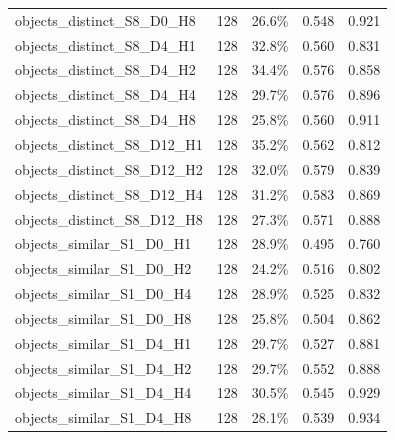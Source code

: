 \documentclass[11pt]{article}
\begin{document}
\begin{longtable}{p{}rrrr}
objects\_\allowbreak{}distinct\_\allowbreak{}S8\_\allowbreak{}D0\_\allowbreak{}H8 & 128 & 26.6\% & 0.548 & 0.921\\
objects\_\allowbreak{}distinct\_\allowbreak{}S8\_\allowbreak{}D4\_\allowbreak{}H1 & 128 & 32.8\% & 0.560 & 0.831\\
objects\_\allowbreak{}distinct\_\allowbreak{}S8\_\allowbreak{}D4\_\allowbreak{}H2 & 128 & 34.4\% & 0.576 & 0.858\\
objects\_\allowbreak{}distinct\_\allowbreak{}S8\_\allowbreak{}D4\_\allowbreak{}H4 & 128 & 29.7\% & 0.576 & 0.896\\
objects\_\allowbreak{}distinct\_\allowbreak{}S8\_\allowbreak{}D4\_\allowbreak{}H8 & 128 & 25.8\% & 0.560 & 0.911\\
objects\_\allowbreak{}distinct\_\allowbreak{}S8\_\allowbreak{}D12\_\allowbreak{}H1 & 128 & 35.2\% & 0.562 & 0.812\\
objects\_\allowbreak{}distinct\_\allowbreak{}S8\_\allowbreak{}D12\_\allowbreak{}H2 & 128 & 32.0\% & 0.579 & 0.839\\
objects\_\allowbreak{}distinct\_\allowbreak{}S8\_\allowbreak{}D12\_\allowbreak{}H4 & 128 & 31.2\% & 0.583 & 0.869\\
objects\_\allowbreak{}distinct\_\allowbreak{}S8\_\allowbreak{}D12\_\allowbreak{}H8 & 128 & 27.3\% & 0.571 & 0.888\\
objects\_\allowbreak{}similar\_\allowbreak{}S1\_\allowbreak{}D0\_\allowbreak{}H1 & 128 & 28.9\% & 0.495 & 0.760\\
objects\_\allowbreak{}similar\_\allowbreak{}S1\_\allowbreak{}D0\_\allowbreak{}H2 & 128 & 24.2\% & 0.516 & 0.802\\
objects\_\allowbreak{}similar\_\allowbreak{}S1\_\allowbreak{}D0\_\allowbreak{}H4 & 128 & 28.9\% & 0.525 & 0.832\\
objects\_\allowbreak{}similar\_\allowbreak{}S1\_\allowbreak{}D0\_\allowbreak{}H8 & 128 & 25.8\% & 0.504 & 0.862\\
objects\_\allowbreak{}similar\_\allowbreak{}S1\_\allowbreak{}D4\_\allowbreak{}H1 & 128 & 29.7\% & 0.527 & 0.881\\
objects\_\allowbreak{}similar\_\allowbreak{}S1\_\allowbreak{}D4\_\allowbreak{}H2 & 128 & 29.7\% & 0.552 & 0.888\\
objects\_\allowbreak{}similar\_\allowbreak{}S1\_\allowbreak{}D4\_\allowbreak{}H4 & 128 & 30.5\% & 0.545 & 0.929\\
objects\_\allowbreak{}similar\_\allowbreak{}S1\_\allowbreak{}D4\_\allowbreak{}H8 & 128 & 28.1\% & 0.539 & 0.934\\

\end{longtable}
\end{document}
